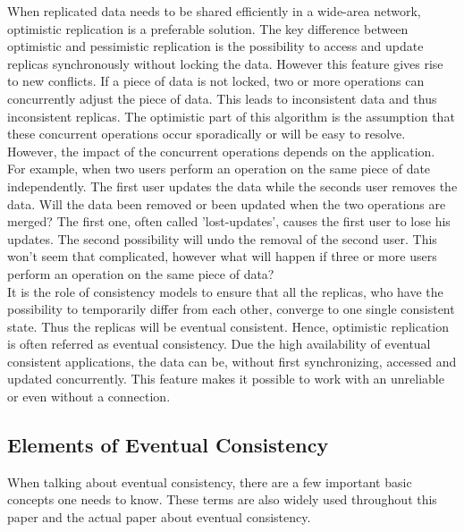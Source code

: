\documentclass[a4paper,12pt]{report}
\begin{document}
When replicated data needs to be shared efficiently in a wide-area network, optimistic replication is a preferable solution. The key difference between optimistic and pessimistic replication is the possibility to access and update replicas synchronously without locking the data. However this feature gives rise to new conflicts. If a piece of data is not locked, two or more operations can concurrently adjust the piece of data. This leads to inconsistent data and thus inconsistent replicas. The optimistic part of this algorithm is the assumption that these concurrent operations occur sporadically or will be easy to resolve. However, the impact of the concurrent operations depends on the application. \\
\indent For example, when two users perform an operation on the same piece of date independently. The first user updates the data while the seconds user removes the data. Will the data been removed or been updated when the two operations are merged? The first one, often called 'lost-updates', causes the first user to lose his updates. The second possibility will undo the removal of the second user. This won't seem that complicated, however what will happen if three or more users perform an operation on the same piece of data? \\
It is the role of consistency models to ensure that all the replicas, who have the possibility to temporarily differ from each other, converge to one single consistent state. Thus the replicas will be eventual consistent. Hence, optimistic replication is often referred as eventual consistency. Due the high availability of eventual consistent applications, the data can be, without first synchronizing, accessed and updated concurrently. This feature makes it possible to work with an unreliable or even without a connection. \\

\subsection{Elements of Eventual Consistency}\label{sec:Elements}

When talking about eventual consistency, there are a few important basic concepts one needs to know. These terms are also widely used throughout this paper and the actual paper about eventual consistency. 
\newline
\end{document}
